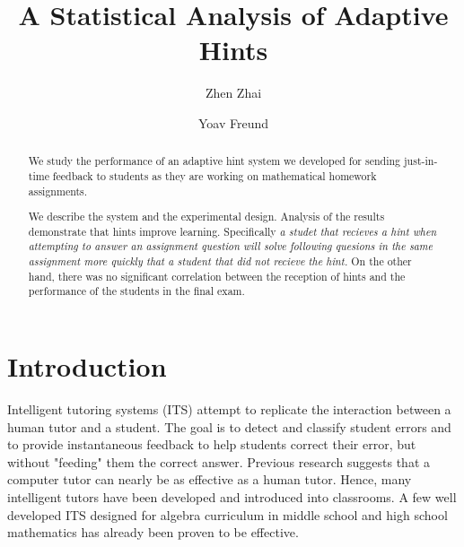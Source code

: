 \documentclass{llncs}
\title{A Statistical Analysis of Adaptive Hints}
\author{Zhen Zhai\inst{1} \and Yoav Freund\inst{2}}
\institute{UC San Diego \email{zzhai@eng.ucsd.edu} \and UC San Diego \email{yfreund@eng.ucsd.edu}}
\begin{document}
\maketitle


\begin{abstract}
We study the performance of an adaptive hint system we developed for
sending just-in-time feedback to students as they are working on
mathematical homework assignments.


We describe the system and the experimental design. Analysis of the
results demonstrate that hints improve learning. Specifically {\em a
  studet that recieves a hint when attempting to answer an assignment
  question will solve following quesions in the same assignment more
  quickly that a student that did not recieve the hint.}  On the other
hand, there was no significant correlation between the reception of
hints and the performance of the students in the final exam.

\end{abstract}


\section{Introduction}
Intelligent tutoring systems (ITS)\cite{Anderson1995} attempt to replicate the interaction between a human tutor and a student. The goal is to detect and classify student errors and to provide instantaneous feedback to help students correct their error, but without "feeding" them the correct answer. Previous research suggests that a computer tutor can nearly be as effective as a human tutor\cite{Vanlehn2011}. Hence, many intelligent tutors have been developed and introduced into classrooms. A few well developed ITS designed for algebra curriculum in middle school and high school mathematics has already been proven to be effective\cite{Koedinger1997,John2014}.
\end{document}

